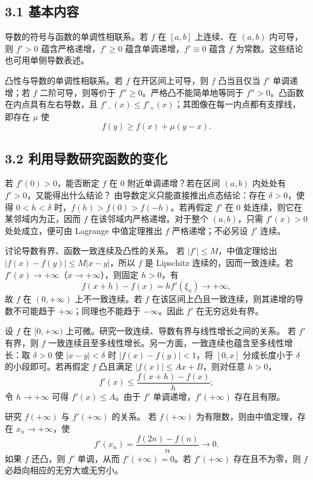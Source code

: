 \subsection*{3.1 基本内容}

导数的符号与函数的单调性相联系。若 $f$ 在 $[a,b]$ 上连续、在 $(a,b)$ 内可导，则 $f'>0$ 蕴含严格递增，$f'\geq0$ 蕴含单调递增，$f'\equiv0$ 蕴含 $f$ 为常数。这些结论也可用单侧导数表述。

凸性与导数的单调性相联系。若 $f$ 在开区间上可导，则 $f$ 凸当且仅当 $f'$ 单调递增；若 $f$ 二阶可导，则等价于 $f''\geq0$。严格凸不能简单地等同于 $f''>0$。凸函数在内点具有左右导数，且 $f'_-(x)\leq f'_+(x)$；其图像在每一内点都有支撑线，即存在 $\mu$ 使
\[
f(y)\geq f(x)+\mu(y-x).
\]

\subsection*{3.2 利用导数研究函数的变化}

若 $f'(0)>0$，能否断定 $f$ 在 $0$ 附近单调递增？若在区间 $(a,b)$ 内处处有 $f'>0$，又能得出什么结论？
\sol 由导数定义只能直接推出点态结论：存在 $\delta>0$，使得 $0<h<\delta$ 时，$f(h)>f(0)>f(-h)$。若再假定 $f'$ 在 $0$ 处连续，则它在某邻域内为正，因而 $f$ 在该邻域内严格递增。对于整个 $(a,b)$，只需 $f'(x)>0$ 处处成立，便可由 Lagrange 中值定理推出 $f$ 严格递增；不必另设 $f'$ 连续。

讨论导数有界、函数一致连续及凸性的关系。
\sol 若 $|f'|\leq M$，中值定理给出 $|f(x)-f(y)|\leq M|x-y|$，所以 $f$ 是 Lipschitz 连续的，因而一致连续。若 $f'(x)\to+\infty$（$x\to+\infty$），则固定 $h>0$，有
\[
f(x+h)-f(x)=h f'(\xi_x)\longrightarrow+\infty,
\]
故 $f$ 在 $(0,+\infty)$ 上不一致连续。若 $f$ 在该区间上凸且一致连续，则其递增的导数不可能趋于 $+\infty$；同理也不能趋于 $-\infty$。因此 $f'$ 在无穷远处有界。

设 $f$ 在 $[0,+\infty)$ 上可微。研究一致连续、导数有界与线性增长之间的关系。
\sol 若 $f'$ 有界，则 $f$ 一致连续且至多线性增长。另一方面，一致连续也蕴含至多线性增长：取 $\delta>0$ 使 $|x-y|<\delta$ 时 $|f(x)-f(y)|<1$，将 $[0,x]$ 分成长度小于 $\delta$ 的小段即可。若再假定 $f$ 凸且满足 $|f(x)|\leq A x+B$，则对任意 $h>0$，
\[
f'(x)\leq\frac{f(x+h)-f(x)}{h};
\]
令 $h\to+\infty$ 可得 $f'(x)\leq A$。由于 $f'$ 单调递增，$f'(+\infty)$ 存在且有限。

研究 $f(+\infty)$ 与 $f'(+\infty)$ 的关系。
\sol 若 $f(+\infty)$ 为有限数，则由中值定理，存在 $x_n\to+\infty$，使
\[
f'(x_n)=\frac{f(2n)-f(n)}{n}\longrightarrow0.
\]
如果 $f$ 还凸，则 $f'$ 单调，从而 $f'(+\infty)=0$。若 $f'(+\infty)$ 存在且不为零，则 $f$ 必趋向相应的无穷大或无穷小。
